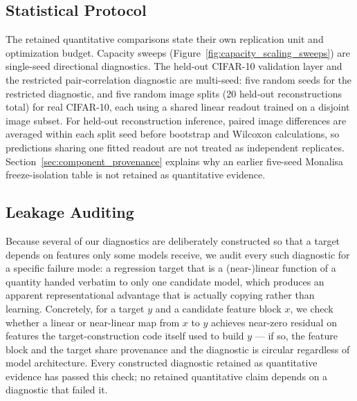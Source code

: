 \documentclass[11pt]{article}
\begin{document}
\subsection{Statistical Protocol}
The retained quantitative comparisons state their own replication unit and optimization budget. Capacity sweeps (Figure~\ref{fig:capacity_scaling_sweeps}) are single-seed directional diagnostics. The held-out CIFAR-10 validation layer and the restricted pair-correlation diagnostic are multi-seed: five random seeds for the restricted diagnostic, and five random image splits (20 held-out reconstructions total) for real CIFAR-10, each using a shared linear readout trained on a disjoint image subset. For held-out reconstruction inference, paired image differences are averaged within each split seed before bootstrap and Wilcoxon calculations, so predictions sharing one fitted readout are not treated as independent replicates. Section~\ref{sec:component_provenance} explains why an earlier five-seed Monalisa freeze-isolation table is not retained as quantitative evidence.

\subsection{Leakage Auditing}
Because several of our diagnostics are deliberately constructed so that a target depends on features only some models receive, we audit every such diagnostic for a specific failure mode: a regression target that is a (near-)linear function of a quantity handed verbatim to only one candidate model, which produces an apparent representational advantage that is actually copying rather than learning. Concretely, for a target $y$ and a candidate feature block $x$, we check whether a linear or near-linear map from $x$ to $y$ achieves near-zero residual on features the target-construction code itself used to build $y$ --- if so, the feature block and the target share provenance and the diagnostic is circular regardless of model architecture. Every constructed diagnostic retained as quantitative evidence has passed this check; no retained quantitative claim depends on a diagnostic that failed it.
\end{document}
